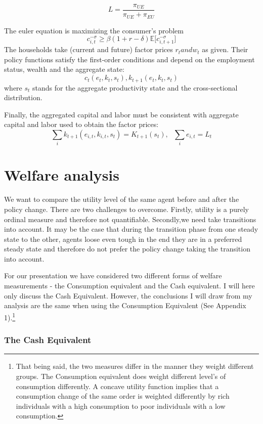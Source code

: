 \documentclass[a4paper,12pt]{article}
\begin{document}
	
	   \begin{equation}
  \label{eq:ssemployment}
   L = \frac{\pi_{UE}}{\pi_{UE}+\pi_{EU}}
 	 \end{equation}

The euler equation is maximizing the consumer's problem
\[ 
c_{i,t}^{- \sigma} \geq \beta (1+r -\delta){\mathbb{E}[c_{i,t+1}^{- \sigma}}]
\]
The households take (current and future) factor prices $r_{t} and w_{t}$ as given. Their policy functions satisfy the first-order conditions and depend on the employment status, wealth and the aggregate state: 
\[ c_{t}(e_{t},k_{t},s_{t}), k_{t+1}(e_{t},k_{t},s_{t})
\]
where $s_{t}$ stands for the aggregate productivity state and the cross-sectional distribution. 

Finally, the aggregated capital and labor must be consistent with aggregate capital and labor used to obtain the factor prices: 
\[ \sum_{i}k_{t+1}(e_{i,t},k_{i,t},s_{t})=K_{t+1}(s_{t}), \ \ \ \sum_{i}e_{i,t}=L_{t} 
\]

\section{Welfare analysis}
We want to compare the utility level of the same agent before and after the policy change. There are two challenges to overcome. Firstly, utility is a purely ordinal measure and therefore not quantifiable. Secondly,we need take transitions into account. It may be the case that during the transition phase from one steady state to the other, agents loose even tough in the end they are in a preferred steady state and therefore do not prefer the policy change taking the transition into account. 

For our presentation we have considered two different forms of welfare measurements - the Consumption equivalent and the Cash equivalent. I will here only discuss the Cash Equivalent. However, the conclusions I will draw from my analysis are the same when using the Consumption Equivalent (See Appendix 1).\footnote{That being said, the two measures differ in the manner they weight different groups. The Consumption equivalent does weight different level's of consumption differently. A concave utility function implies that a consumption change of the same order is weighted differently by rich individuals with a high consumption to poor individuals with a low consumption.} 

\subsubsection*{The Cash Equivalent}
\end{document}

